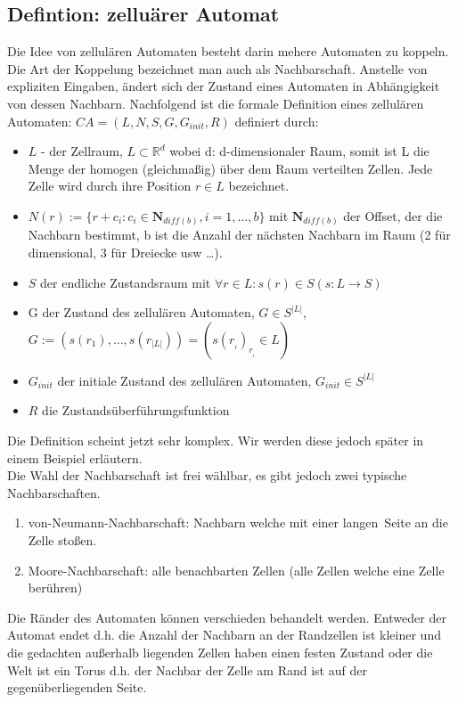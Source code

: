 \documentclass[11pt, fleqn, a4paper, leqno]{scrartcl} %
\begin{document}
	\subsection{Defintion: zelluärer Automat}
		Die Idee von zellulären Automaten besteht darin mehere Automaten zu koppeln. Die Art der Koppelung bezeichnet man auch als Nachbarschaft. Anstelle von expliziten Eingaben, ändert sich der Zustand eines Automaten in Abhängigkeit von dessen Nachbarn. Nachfolgend ist die formale Definition eines zellulären Automaten: $CA=(L,N,S,G,G_{init},R)$ definiert durch:
		\begin{itemize}
			\item $L$ - der Zellraum, $L \subset \mathds{R}^{d}$ wobei d: d-dimensionaler Raum, somit ist L die Menge der homogen (gleichmaßig) über dem Raum verteilten Zellen. Jede Zelle wird durch ihre Position $r\in L$ bezeichnet.
			\item $N(r) := \{r+c_{i}:c_{i} \in \mathbf{N}_{diff(b)}, i = 1,\dots,b\}$ mit $\mathbf{N}_{diff(b)}$ der Offset, der die Nachbarn bestimmt, b ist die Anzahl der nächsten Nachbarn im Raum (2 für dimensional, 3 für Dreiecke usw \dots).
			\item $S$ der endliche Zustandsraum  mit $\forall r \in L : s(r) \in S (s : L \rightarrow S)$
			\item G der Zustand des zellulären Automaten, $G \in S^{|L|}$,$G := (s(r_{1}),\dots,s(r_{|L|})) = (s(r_{_{i}})_{r_{_{i}}} \in L)$
			\item $G_{init}$ der initiale Zustand des zellulären Automaten, $G_{init} \in S^{|L|}$
			\item $R$ die Zustandsüberführungsfunktion
		\end{itemize}
		Die Definition scheint jetzt sehr komplex. Wir werden diese jedoch später in einem Beispiel erläutern.\\
		Die Wahl der Nachbarschaft ist frei wählbar, es gibt jedoch zwei typische Nachbarschaften.\\
		\begin{enumerate}
		\item von-Neumann-Nachbarschaft: Nachbarn welche mit einer \glqq langen\grqq\ Seite an die Zelle stoßen.
		\item Moore-Nachbarschaft: alle benachbarten Zellen (alle Zellen welche eine Zelle berühren)
		\end{enumerate}
		Die Ränder des Automaten können verschieden behandelt werden. Entweder der Automat endet d.h. die Anzahl der Nachbarn an der Randzellen ist kleiner und die gedachten außerhalb liegenden Zellen haben einen festen Zustand oder die Welt ist ein Torus d.h. der Nachbar der Zelle am Rand ist auf der gegenüberliegenden Seite.\\
\end{document}
